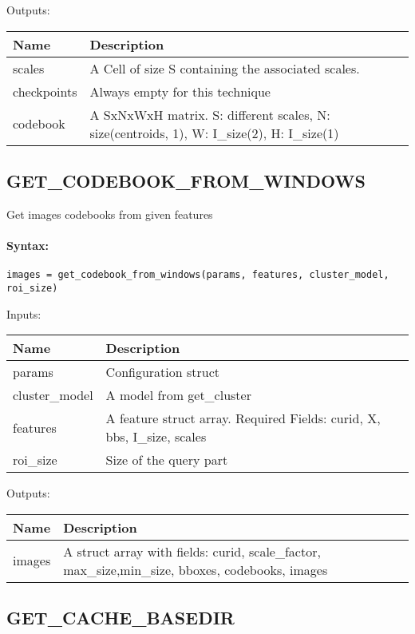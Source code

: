 \bigskip
Outputs:

\begin{tabular}{|p{}|p{}|}
\hline
\textbf{Name} & \textbf{Description} \\
\hline \hline
scales & A Cell of size S containing the associated scales.  \\ \hline
checkpoints & Always empty for this technique  \\ \hline
codebook & A SxNxWxH matrix. S: different scales, N: size(centroids, 1), W: I\_size(2), H: I\_size(1)  \\ \hline
\end{tabular}

\subsection{GET\_CODEBOOK\_FROM\_WINDOWS}

Get images codebooks from given features

\paragraph{Syntax:} \verb|images = get_codebook_from_windows(params, features, cluster_model, roi_size)|

\bigskip
Inputs:

\begin{tabular}{|p{}|p{}|}
\hline
\textbf{Name} & \textbf{Description} \\
\hline \hline
params & Configuration struct  \\ \hline
cluster\_model & A model from get\_cluster  \\ \hline
features & A feature struct array. Required Fields: curid, X, bbs, I\_size, scales  \\ \hline
roi\_size & Size of the query part  \\ \hline
\end{tabular}

\bigskip
Outputs:

\begin{tabular}{|p{}|p{}|}
\hline
\textbf{Name} & \textbf{Description} \\
\hline \hline
images & A struct array with fields: curid, scale\_factor, max\_size,min\_size, bboxes, codebooks, images  \\ \hline
\end{tabular}

\subsection{GET\_CACHE\_BASEDIR}

